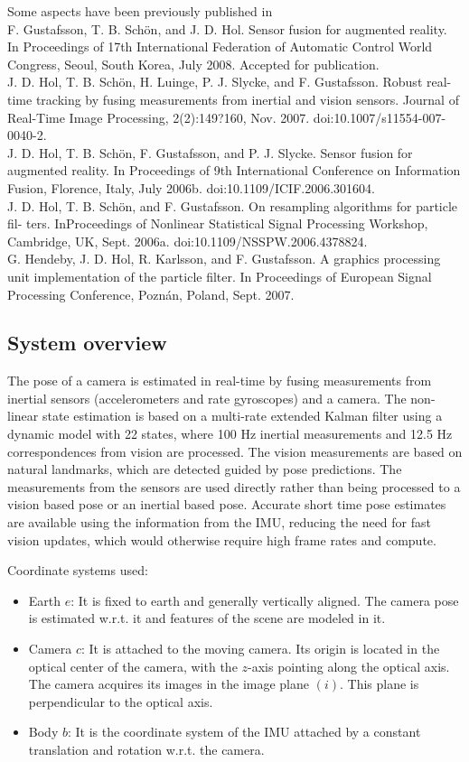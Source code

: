Some aspects have been previously published in \\
F. Gustafsson, T. B. Sch{\"o}n, and J. D. Hol. Sensor fusion for augmented reality. In Proceedings of 17th International Federation of Automatic Control World Congress, Seoul, South Korea, July 2008. Accepted for publication. \\
J. D. Hol, T. B. Sch{\"o}n, H. Luinge, P. J. Slycke, and F. Gustafsson. Robust real-time tracking by fusing measurements from inertial and vision sensors. Journal of Real-Time Image Processing, 2(2):149?160, Nov. 2007. doi:10.1007/s11554-007-0040-2. \\
J. D. Hol, T. B. Sch{\"o}n, F. Gustafsson, and P. J. Slycke. Sensor fusion for augmented reality. In Proceedings of 9th International Conference on Information Fusion, Florence, Italy, July 2006b. doi:10.1109/ICIF.2006.301604. \\
J. D. Hol, T. B. Sch{\"o}n, and F. Gustafsson. On resampling algorithms for particle fil- ters. InProceedings of Nonlinear Statistical Signal Processing Workshop, Cambridge, UK, Sept. 2006a. doi:10.1109/NSSPW.2006.4378824. \\
G. Hendeby, J. D. Hol, R. Karlsson, and F. Gustafsson. A graphics processing unit
implementation of the particle filter. In Proceedings of European Signal Processing Conference, Pozn{\'a}n, Poland, Sept. 2007.

\subsection{System overview}

The pose of a camera is estimated in real-time by fusing measurements from  inertial sensors (accelerometers and rate gyroscopes) and a camera. The non-linear state estimation is based on a multi-rate extended Kalman filter using a dynamic model with 22 states, where 100 Hz inertial measurements and 12.5 Hz correspondences from vision are processed. The vision measurements are based on natural landmarks, which are detected guided by pose predictions. The measurements from the sensors are used directly rather than being processed to a vision based pose or an inertial based pose. Accurate short time pose estimates are available using the information from the IMU, reducing the need for fast vision updates, which would otherwise require high frame rates and compute.

Coordinate systems used:
\begin{itemize}
	\item Earth $ e $: It is fixed to earth and generally vertically aligned.  The camera pose is estimated w.r.t. it and features of the scene are modeled in it.
	\item Camera $ c $: It is attached to the moving camera. Its origin is 	located in the optical center of the camera, with the $ z $-axis pointing along the optical axis. The camera acquires its images in the image plane $ (i) $. This plane is perpendicular to the optical axis.
	\item Body $ b $: It is the coordinate system of the IMU attached by a constant translation and rotation w.r.t. the camera.
\end{itemize}

